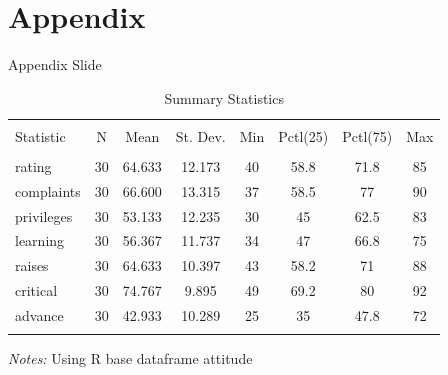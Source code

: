 \documentclass{beamer}
\begin{document}
\section{Appendix}

\begin{frame}{Appendix Slide}\label{appendix1}

    {\fontsize{9}{10}\selectfont
    
        \begin{table}[!htbp] \centering 
        \caption{Summary Statistics}
        \label{appendix_summ_stat}
            \begin{tabular}{@{\extracolsep{5pt}}lccccccc} 
            \hline 
            \hline \\[-1.8ex] 
            Statistic & \multicolumn{1}{c}{N} & \multicolumn{1}{c}{Mean} & \multicolumn{1}{c}{St. Dev.} & \multicolumn{1}{c}{Min} & \multicolumn{1}{c}{Pctl(25)} & \multicolumn{1}{c}{Pctl(75)} & \multicolumn{1}{c}{Max} \\ 
            \hline \\[-1.8ex] 
            rating & 30 & 64.633 & 12.173 & 40 & 58.8 & 71.8 & 85 \\ 
            complaints & 30 & 66.600 & 13.315 & 37 & 58.5 & 77 & 90 \\ 
            privileges & 30 & 53.133 & 12.235 & 30 & 45 & 62.5 & 83 \\ 
            learning & 30 & 56.367 & 11.737 & 34 & 47 & 66.8 & 75 \\ 
            raises & 30 & 64.633 & 10.397 & 43 & 58.2 & 71 & 88 \\ 
            critical & 30 & 74.767 & 9.895 & 49 & 69.2 & 80 & 92 \\ 
            advance & 30 & 42.933 & 10.289 & 25 & 35 & 47.8 & 72 \\ 
            \hline \\[-1.8ex] 
            \end{tabular} 
            
            \textit{Notes:} Using R base dataframe attitude \\ 
        \end{table} 
        
    }
    
    \hyperlink{main1}{}
\end{frame}
\end{document}
